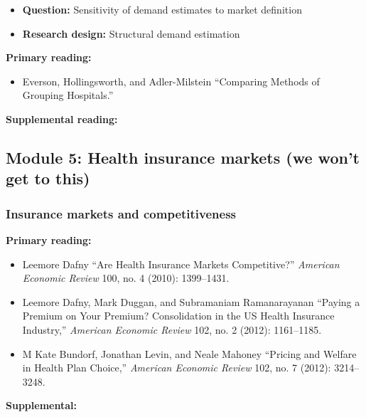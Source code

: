 \documentclass[11pt,]{article}
\providecommand{\tightlist}{%
  \setlength{\itemsep}{0pt}\setlength{\parskip}{0pt}}
\begin{document}
\begin{itemize}
\tightlist
\item
  \textbf{Question:} Sensitivity of demand estimates to market
  definition
\item
  \textbf{Research design:} Structural demand estimation
\end{itemize}

\textbf{Primary reading:}

\begin{itemize}
\tightlist
\item
  Everson, Hollingsworth, and Adler-Milstein {``Comparing Methods of
  Grouping Hospitals.''}
\end{itemize}

\textbf{Supplemental reading:}

\hypertarget{module-5-health-insurance-markets-we-wont-get-to-this}{%
\subsection{Module 5: Health insurance markets (we won't get to
this)}\label{module-5-health-insurance-markets-we-wont-get-to-this}}

\hypertarget{insurance-markets-and-competitiveness}{%
\subsubsection{Insurance markets and
competitiveness}\label{insurance-markets-and-competitiveness}}

\textbf{Primary reading:}

\begin{itemize}
\tightlist
\item
  Leemore Dafny {``Are {Health} {Insurance} {Markets} {Competitive}?''}
  \emph{American Economic Review} 100, no. 4 (2010): 1399--1431.
\item
  Leemore Dafny, Mark Duggan, and Subramaniam Ramanarayanan {``Paying a
  {Premium} on {Your} {Premium}? {Consolidation} in the {US} {Health}
  {Insurance} {Industry},''} \emph{American Economic Review} 102, no. 2
  (2012): 1161--1185.
\item
  M Kate Bundorf, Jonathan Levin, and Neale Mahoney {``Pricing and
  Welfare in Health Plan Choice,''} \emph{American Economic Review} 102,
  no. 7 (2012): 3214--3248.
\end{itemize}

\textbf{Supplemental:}
\end{document}
